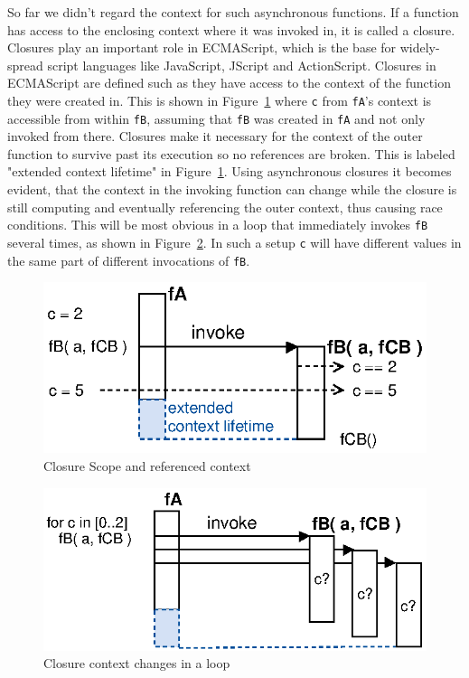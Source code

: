 So far we didn't regard the context for such asynchronous functions.
If a function has access to the enclosing context where it was invoked in, it is called a closure.
Closures play an important role in \textrm{ECMAScript}\cite{EcmaScript}, which is the base for widely-spread script languages like JavaScript, JScript and ActionScript.
Closures in \textrm{ECMAScript} are defined such as they have access to the context of the function they were created in.
This is shown in Figure~\ref{fig:Closures_Closure-1} where \texttt{c} from \texttt{fA}'s context is accessible from within \texttt{fB}, assuming that \texttt{fB} was created in \texttt{fA} and not only invoked from there.
Closures make it necessary for the context of the outer function to survive past its execution so no references are broken.
This is labeled "extended context lifetime" in Figure~\ref{fig:Closures_Closure-1}.
Using asynchronous closures it becomes evident, that the context in the invoking function can change while the closure is still computing and eventually referencing the outer context, thus causing race conditions.
This will be most obvious in a loop that immediately invokes \texttt{fB} several times, as shown in Figure~\ref{fig:Closures_Closure-2}.
In such a setup \texttt{c} will have different values in the same part of different invocations of \texttt{fB}.
\begin{figure}[!ht]
	\centering
  \includegraphics{figures/Closures_Closure-1}
	\caption{Closure Scope and referenced context}
	\label{fig:Closures_Closure-1}
\end{figure}
\begin{figure}[!ht]
	\centering
  \includegraphics{figures/Closures_Closure-2}
	\caption{Closure context changes in a loop}
	\label{fig:Closures_Closure-2}
\end{figure}


